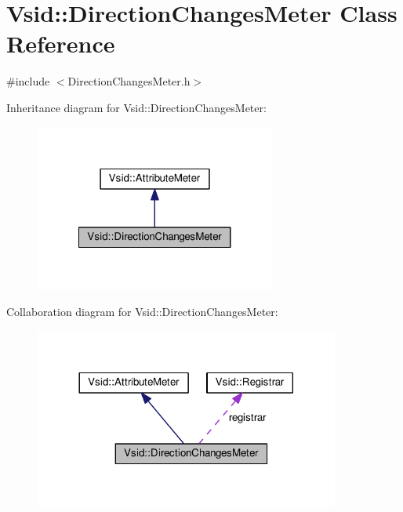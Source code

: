 \hypertarget{class_vsid_1_1_direction_changes_meter}{\section{Vsid\-:\-:Direction\-Changes\-Meter Class Reference}
\label{class_vsid_1_1_direction_changes_meter}
}


{\ttfamily \#include $<$Direction\-Changes\-Meter.\-h$>$}



Inheritance diagram for Vsid\-:\-:Direction\-Changes\-Meter\-:
\nopagebreak
\begin{figure}[H]
\begin{center}
\leavevmode
\includegraphics[width=224pt]{class_vsid_1_1_direction_changes_meter__inherit__graph}
\end{center}
\end{figure}


Collaboration diagram for Vsid\-:\-:Direction\-Changes\-Meter\-:
\nopagebreak
\begin{figure}[H]
\begin{center}
\leavevmode
\includegraphics[width=284pt]{class_vsid_1_1_direction_changes_meter__coll__graph}
\end{center}
\end{figure}
